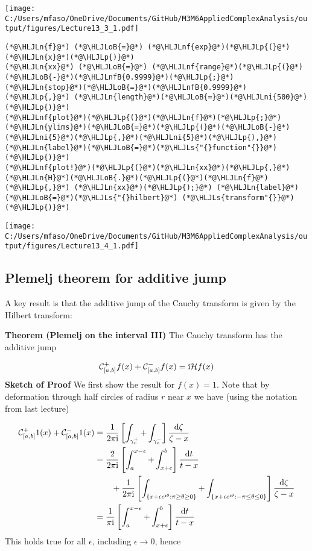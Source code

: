 \documentclass[12pt,a4paper]{article}
\newcommand{\HLJLn}[1]{#1}
\newcommand{\HLJLnf}[1]{\textcolor[RGB]{66,102,213}{#1}}
\newcommand{\HLJLs}[1]{\textcolor[RGB]{201,61,57}{#1}}
\newcommand{\HLJLnfB}[1]{\textcolor[RGB]{59,151,46}{#1}}
\newcommand{\HLJLni}[1]{\textcolor[RGB]{59,151,46}{#1}}
\newcommand{\HLJLoB}[1]{\textcolor[RGB]{102,102,102}{\textbf{#1}}}
\newcommand{\HLJLp}[1]{#1}
\def\D{ {\rm d} }
\def\I{ {\rm i} }
\def\CC{ {\cal C} }
\def\HH{ {\cal H} }
\def\dt{\D t}
\begin{document}
\texttt{[image: C:/Users/mfaso/OneDrive/Documents/GitHub/M3M6AppliedComplexAnalysis/output/figures/Lecture13\_3\_1.pdf]}

\begin{lstlisting}
(*@\HLJLn{f}@*) (*@\HLJLoB{=}@*) (*@\HLJLnf{exp}@*)(*@\HLJLp{(}@*)(*@\HLJLn{x}@*)(*@\HLJLp{)}@*)
(*@\HLJLn{xx}@*) (*@\HLJLoB{=}@*) (*@\HLJLnf{range}@*)(*@\HLJLp{(}@*)(*@\HLJLoB{-}@*)(*@\HLJLnfB{0.9999}@*)(*@\HLJLp{;}@*) (*@\HLJLn{stop}@*)(*@\HLJLoB{=}@*)(*@\HLJLnfB{0.9999}@*)(*@\HLJLp{,}@*) (*@\HLJLn{length}@*)(*@\HLJLoB{=}@*)(*@\HLJLni{500}@*)(*@\HLJLp{)}@*)
(*@\HLJLnf{plot}@*)(*@\HLJLp{(}@*)(*@\HLJLn{f}@*)(*@\HLJLp{;}@*) (*@\HLJLn{ylims}@*)(*@\HLJLoB{=}@*)(*@\HLJLp{(}@*)(*@\HLJLoB{-}@*)(*@\HLJLni{5}@*)(*@\HLJLp{,}@*)(*@\HLJLni{5}@*)(*@\HLJLp{),}@*) (*@\HLJLn{label}@*)(*@\HLJLoB{=}@*)(*@\HLJLs{"{}function"{}}@*)(*@\HLJLp{)}@*)
(*@\HLJLnf{plot!}@*)(*@\HLJLp{(}@*)(*@\HLJLn{xx}@*)(*@\HLJLp{,}@*) (*@\HLJLn{H}@*)(*@\HLJLoB{.}@*)(*@\HLJLp{(}@*)(*@\HLJLn{f}@*)(*@\HLJLp{,}@*) (*@\HLJLn{xx}@*)(*@\HLJLp{);}@*) (*@\HLJLn{label}@*)(*@\HLJLoB{=}@*)(*@\HLJLs{"{}hilbert}@*) (*@\HLJLs{transform"{}}@*)(*@\HLJLp{)}@*)
\end{lstlisting}

\texttt{[image: C:/Users/mfaso/OneDrive/Documents/GitHub/M3M6AppliedComplexAnalysis/output/figures/Lecture13\_4\_1.pdf]}

\subsection{Plemelj theorem for additive jump}
A key result is that the additive jump of the Cauchy transform is given by the Hilbert transform:

\textbf{Theorem (Plemelj on the interval III)} The Cauchy transform has the additive jump

\[
\CC_{[a,b]}^+ f(x) + \CC_{[a,b]}^- f(x) = \I \HH f(x)
\]
\textbf{Sketch of Proof} We first show the result for $f(x) = 1$. Note that by deformation through half circles of radius $r$ near $x$ we have (using the notation from last lecture)


\begin{align*}
\CC_{[a,b]}^+ 1(x) + \CC_{[a,b]}^- 1(x) &= {1 \over 2 \pi\I} \left[\int_{\gamma_x^+} + \int_{\gamma_x^-} \right] {\D \zeta \over \zeta -x}  \\
        & = {2 \over 2 \pi \I} \left[ \int_a^{x-\epsilon} + \int_{x+\epsilon}^b \right] {\dt \over t - x} \cr
        & \qquad + {1 \over 2 \pi \I} \left[ \int_{\{x + \epsilon e^{\I \theta} : \pi \geq \theta \geq 0 \}} + \int_{\{x + \epsilon e^{\I \theta} : -\pi \leq \theta \leq 0 \}} \right] {\D\zeta \over \zeta - x} \\
&= {1 \over  \pi \I} \left[ \int_a^{x-\epsilon} + \int_{x+\epsilon}^b \right] {\dt \over t - x}
\end{align*}
This holds true for all $\epsilon$, including $\epsilon \rightarrow 0$, hence
\end{document}
